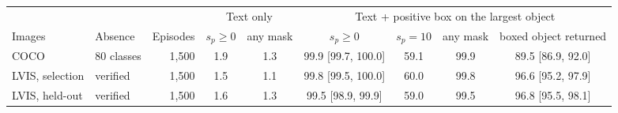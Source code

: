 \begin{tabular}{@{}llr cc cccc@{}}
\toprule
 & & & \multicolumn{2}{c}{Text only} & \multicolumn{4}{c}{Text + positive box on the largest object} \\
\cmidrule(lr){4-5}\cmidrule(l){6-9}
Images & Absence & Episodes & $s_p\!\geq\!0$ & any mask & $s_p\!\geq\!0$ & $s_p\!=\!10$ & any mask & boxed object returned \\
\midrule
COCO & 80 classes & 1,500 & 1.9 & 1.3 & 99.9 {\scriptsize[99.7, 100.0]} & 59.1 & 99.9 & 89.5 {\scriptsize[86.9, 92.0]} \\
LVIS, selection & verified & 1,500 & 1.5 & 1.1 & 99.8 {\scriptsize[99.5, 100.0]} & 60.0 & 99.8 & 96.6 {\scriptsize[95.2, 97.9]} \\
LVIS, held-out & verified & 1,500 & 1.6 & 1.3 & 99.5 {\scriptsize[98.9, 99.9]} & 59.0 & 99.5 & 96.8 {\scriptsize[95.5, 98.1]} \\
\bottomrule
\end{tabular}
